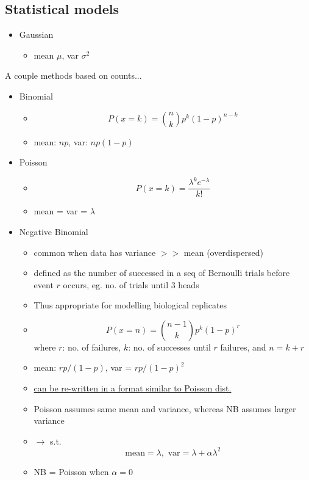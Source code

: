 \documentclass[font=12pt]{article}
\begin{document}
\subsection{Statistical models}
\begin{itemize}
	\item Gaussian
	\begin{itemize}
		\item mean $ \mu $, var $ \sigma^2 $
	\end{itemize}
\end{itemize}
A couple methods based on counts...
\begin{itemize}
	\item Binomial
	\begin{itemize}
		\item \[P(x=k)= {n\choose k} p^k (1-p)^{n-k} \]
		\item mean: $ np $, var: $ np(1-p) $
	\end{itemize}
	\item Poisson
	\begin{itemize}
		\item \[P(x=k) = \dfrac{\lambda^k e^{-\lambda}}{k!}\]
		\item mean = var = $ \lambda $
	\end{itemize}
	\item Negative Binomial
	\begin{itemize}
		\item common when data has variance $ >> $ mean (overdispersed)
		\item defined as the number of successed in a seq of Bernoulli trials before  event $ r $ occurs, eg. no. of trials until 3 heads
		\item Thus appropriate for modelling biological replicates
		\item \[P(x=n) = {n-1\choose k}p^k(1-p)^r\]
		where $ r $: no. of failures, $ k $: no. of successes until $ r $ failures, and $ n = k + r $
		\item mean: $ rp/(1-p) $, var = $ rp / (1-p)^2 $
		\item \underline{can be re-written in a format similar to Poisson dist.}
		\item Poisson assumes same mean and variance, whereas NB assumes larger variance
		\item $\to$  s.t. 
		\[\text{mean} = \lambda, \text{ var} = \lambda + \alpha\lambda^2\]
		\item NB = Poisson when $ \alpha = 0 $
	\end{itemize}
\end{itemize}
\end{document}

